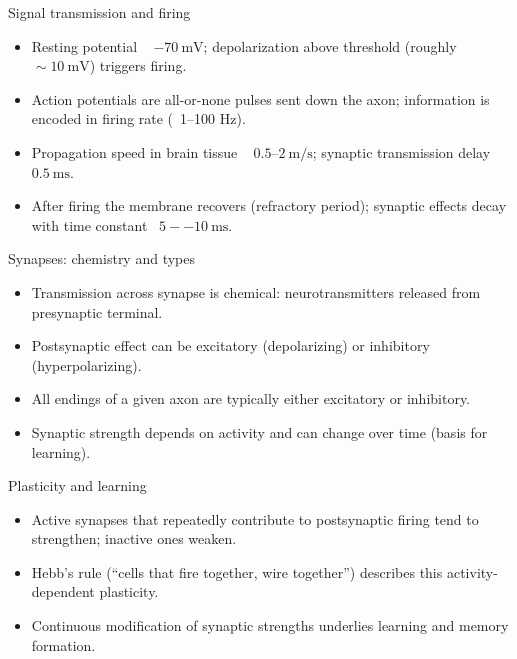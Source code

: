 \documentclass{beamer}
\begin{document}
\begin{frame}{Signal transmission and firing}
    \begin{itemize}
        \item Resting potential ~ $-70\ \mathrm{mV}$; depolarization above threshold (roughly $\!\sim10\ \mathrm{mV}$) triggers firing.
        \item Action potentials are all-or-none pulses sent down the axon; information is encoded in firing rate (~1--100 Hz).
        \item Propagation speed in brain tissue ~ $0.5$--$2\ \mathrm{m/s}$; synaptic transmission delay ~ $0.5\ \mathrm{ms}$.
        \item After firing the membrane recovers (refractory period); synaptic effects decay with time constant ~$5--10\ \mathrm{ms}$.
    \end{itemize}
\end{frame}

\begin{frame}{Synapses: chemistry and types}
    \begin{itemize}
        \item Transmission across synapse is chemical: neurotransmitters released from presynaptic terminal.
        \item Postsynaptic effect can be excitatory (depolarizing) or inhibitory (hyperpolarizing).
        \item All endings of a given axon are typically either excitatory or inhibitory.
        \item Synaptic strength depends on activity and can change over time (basis for learning).
    \end{itemize}
\end{frame}

\begin{frame}{Plasticity and learning}
    \begin{itemize}
        \item Active synapses that repeatedly contribute to postsynaptic firing tend to strengthen; inactive ones weaken.
        \item Hebb's rule (``cells that fire together, wire together'') describes this activity-dependent plasticity.
        \item Continuous modification of synaptic strengths underlies learning and memory formation.
    \end{itemize}
\end{frame}
\end{document}
